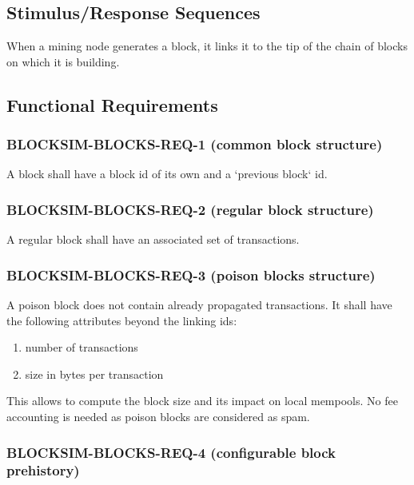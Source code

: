 \documentclass{scrreprt}
\begin{document}
    \subsection{Stimulus/Response Sequences}

      When a mining node generates a block, it links it to the tip of the chain
      of blocks on which it is building.

    \subsection{Functional Requirements}

      \subsubsection{BLOCKSIM-BLOCKS-REQ-1 (common block structure)}

        A block shall have a block id of its own and a `previous block` id.

      \subsubsection{BLOCKSIM-BLOCKS-REQ-2 (regular block structure)}

        A regular block shall have an associated set of transactions.

      \subsubsection{BLOCKSIM-BLOCKS-REQ-3 (poison blocks structure)}

        A poison block does not contain already propagated transactions.
        It shall have the following attributes beyond the linking ids:

        \begin{enumerate}
          \item number of transactions
          \item size in bytes per transaction
        \end{enumerate}

        This allows to compute the block size and its impact on local
        mempools. No fee accounting is needed as poison blocks are
        considered as spam.

      \subsubsection{BLOCKSIM-BLOCKS-REQ-4 (configurable block prehistory)}
\end{document}
